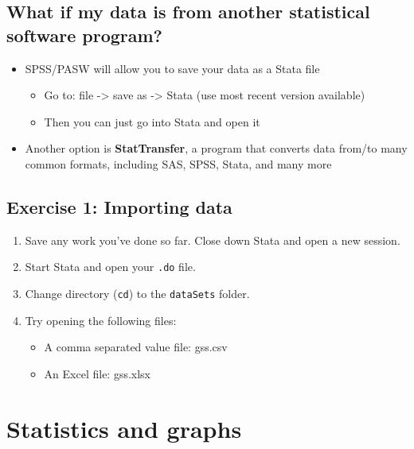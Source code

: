 \documentclass[]{book}
\providecommand{\tightlist}{%
  \setlength{\itemsep}{0pt}\setlength{\parskip}{0pt}}
\begin{document}
\subsection{What if my data is from another statistical software
program?}\label{what-if-my-data-is-from-another-statistical-software-program}

\begin{itemize}
\tightlist
\item
  SPSS/PASW will allow you to save your data as a Stata file

  \begin{itemize}
  \tightlist
  \item
    Go to: file -\textgreater{} save as -\textgreater{} Stata (use most
    recent version available)
  \item
    Then you can just go into Stata and open it
  \end{itemize}
\item
  Another option is \textbf{StatTransfer}, a program that converts data
  from/to many common formats, including SAS, SPSS, Stata, and many more
\end{itemize}

\subsection{Exercise 1: Importing data}\label{exercise-1-importing-data}

\begin{enumerate}
\def\labelenumi{\arabic{enumi}.}
\tightlist
\item
  Save any work you've done so far. Close down Stata and open a new
  session.
\item
  Start Stata and open your \texttt{.do} file.
\item
  Change directory (\texttt{cd}) to the \texttt{dataSets} folder.
\item
  Try opening the following files:

  \begin{itemize}
  \tightlist
  \item
    A comma separated value file: gss.csv
  \item
    An Excel file: gss.xlsx
  \end{itemize}
\end{enumerate}

\section{Statistics and graphs}\label{statistics-and-graphs}
\end{document}
